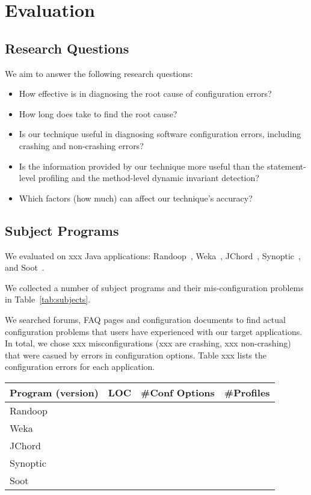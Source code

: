 \section{Evaluation}
\label{sec:evaluation}

\subsection{Research Questions}

We aim to answer the following research questions:

\begin{itemize}
\item How effective is \ourtool in diagnosing the root cause of
configuration errors?
\item How long does \ourtool take to find the root cause?
\item Is our technique useful in diagnosing software configuration errors, including
crashing and non-crashing errors?
\item Is the information provided by our technique more useful than the statement-level
profiling and the method-level dynamic invariant detection?
\item Which factors (how much) can affect our technique's accuracy?
\end{itemize}

\subsection{Subject Programs}

We evaluated \ourtool on xxx Java applications: Randoop~\cite{randoop},
Weka~\cite{weka}, JChord~\cite{jchord}, Synoptic~\cite{synoptic},
and Soot~\cite{soot}.

We collected a number of subject programs and their mis-configuration problems in
Table~\ref{tab:subjects}.

We searched forums, FAQ pages and configuration documents to find
actual configuration problems that users have experienced with our
target applications. In total, we chose xxx misconfigurations (xxx
are crashing, xxx non-crashing) that were casued by errors in
configuration options. Table xxx lists the configuration errors for each application.

\begin{table}[t]
\begin{tabular}{|l|c|c|c|}
\hline
 Program (version) & LOC & \#Conf Options & \#Profiles\\
 \hline
 \hline
 Randoop & & & \\
 Weka &  & & \\
 JChord & & & \\
 Synoptic & && \\
 Soot &  &  & \\
\hline
\end{tabular}


\end{table}

